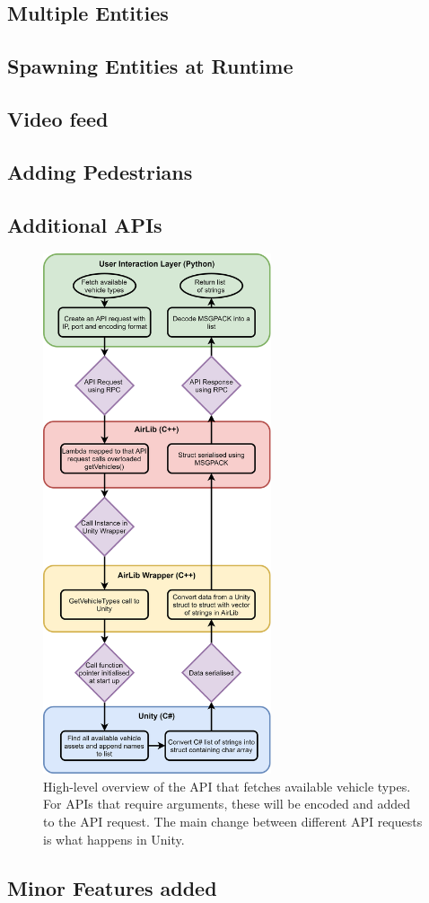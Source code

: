 \subsection{Multiple Entities}

\subsection{Spawning Entities at Runtime}

\subsection{Video feed}

\subsection{Adding Pedestrians}

\subsection{Additional APIs}

\begin{figure}[h]
    \centering
    \includegraphics[width=0.6\textwidth]{06_Implementation/00_AirSim/Diagrams/stringArray.png}
    \caption{High-level overview of the API that fetches available vehicle types. For APIs that require arguments, these will be encoded and added to the API request. The main change between different API requests is what happens in Unity.} \label{06:stringList}
\end{figure}

\subsection{Minor Features added}
